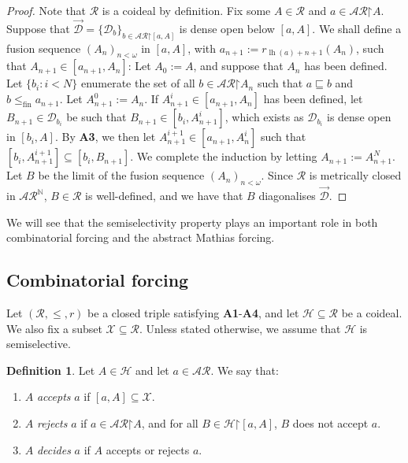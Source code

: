 \documentclass[11pt,reqno]{amsart}
\theoremstyle{plain}
\numberwithin{equation}{section}
\theoremstyle{definition}
\newtheorem{definition}[theorem]{Definition}
\newcommand{\func}{\operatorname}
\newcommand{\N}{\mathbb{N}}
\newcommand{\cal}{\mathcal}
\newcommand{\restrictedto}{\mathord{\upharpoonright}}
\newcommand{\X}{\cal{X}}
\renewcommand{\H}{\cal{H}}
\newcommand{\lh}{\func{lh}}
\newcommand{\fin}{\mathrm{fin}}
\newcommand{\D}{\cal{D}}
\begin{document}
\begin{proof}
    Note that $\cal{R}$ is a coideal by definition. Fix some $A \in \cal{R}$ and $a \in \cal{AR}\restrictedto A$. Suppose that $\vec{\D} = \{\D_b\}_{b \in \cal{AR}\restrictedto[a,A]}$ is dense open below $[a,A]$. We shall define a fusion sequence $(A_n)_{n<\omega}$ in $[a,A]$, with $a_{n+1} := r_{\lh(a)+n+1}(A_n)$, such that $A_{n+1} \in [a_{n+1},A_n]$: Let $A_0 := A$, and suppose that $A_n$ has been defined. Let $\{b_i : i < N\}$ enumerate the set of all $b \in \cal{AR}\restrictedto A_n$ such that $a \sqsubseteq b$ and $b \leq_\fin a_{n+1}$. Let $A_{n+1}^0 := A_n$. If $A_{n+1}^i \in [a_{n+1},A_n]$ has been defined, let $B_{n+1} \in \D_{b_i}$ be such that $B_{n+1} \in [b_i,A_{n+1}^i]$, which exists as $\D_{b_i}$ is dense open in $[b_i,A]$. By \textbf{A3}, we then let $A_{n+1}^{i+1} \in [a_{n+1},A_n^i]$ such that $[b_i,A_{n+1}^{i+1}] \subseteq [b_i,B_{n+1}]$. We complete the induction by letting $A_{n+1} := A_{n+1}^N$. Let $B$ be the limit of the fusion sequence $(A_n)_{n<\omega}$. Since $\cal{R}$ is metrically closed in $\cal{AR}^\N$, $B \in \cal{R}$ is well-defined, and we have that $B$ diagonalises $\vec{\D}$. 
\end{proof}

We will see that the semiselectivity property plays an important role in both combinatorial forcing and the abstract Mathias forcing.

\subsection{Combinatorial forcing}
Let $(\cal{R},\leq,r)$ be a closed triple satisfying \textbf{A1}-\textbf{A4}, and let $\H \subseteq \cal{R}$ be a coideal. We also fix a subset $\X \subseteq \cal{R}$. Unless stated otherwise, we assume that $\H$ is semiselective.

\begin{definition}
    Let $A \in \H$ and let $a \in \cal{AR}$. We say that: 
    \begin{enumerate}
        \item $A$ \emph{accepts} $a$ if $[a,A] \subseteq \X$.
        
        \item $A$ \emph{rejects} $a$ if $a \in \cal{AR}\restrictedto A$, and for all $B \in \H\restrictedto[a,A]$, $B$ does not accept $a$.
        
        \item $A$ \emph{decides} $a$ if $A$ accepts or rejects $a$.
    \end{enumerate}
\end{definition}
\end{document}
